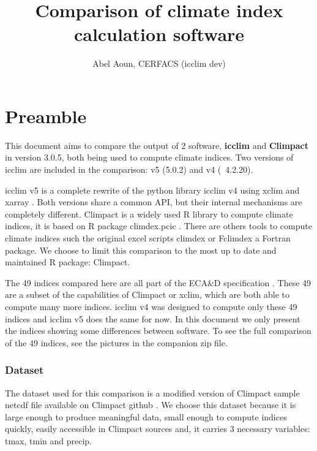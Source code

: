 \documentclass[a4paper,11pt]{article}
\title{Comparison of climate index calculation software}
\author{Abel Aoun, CERFACS (icclim dev)}
\begin{document}
\maketitle
\part*{Preamble}
    This document aims to compare the output of 2 software, \textbf{icclim} \cite{gh/icclim} and \textbf{Climpact} \cite{gh/Climpact} in version 3.0.5, both being used to compute climate indices.
    Two versions of icclim are included in the comparison: v5 (5.0.2) and v4 (~4.2.20).

    icclim v5 is a complete rewrite of the python library icclim v4 using xclim \cite{gh/xclim} and xarray \cite{gh/xarray}. Both versions share a common API, but their internal mechanisms are completely different.
    Climpact is a widely used R library to compute climate indices, it is based on R package climdex.pcic \cite{gh/climdex}.
    There are others tools to compute climate indices such the original excel scripts climdex \cite{doc/climdex} or Fclimdex \cite{gh/fclimdex} a Fortran package.
    We choose to limit this comparison to the most up to date and maintained R package: Climpact.

    The 49 indices compared here are all part of the ECA\&D specification \cite{doc/ecad_new}.
    These 49 are a subset of the capabilities of Climpact or xclim, which are both able to compute many more indices.
    icclim v4 was designed to compute only these 49 indices and icclim v5 does the same for now.
    In this document we only present the indices showing some differences between software.
    To see the full comparison of the 49 indices, see the pictures in the companion zip file.

    \section{Dataset}
        The dataset used for this comparison is a modified version of Climpact sample netcdf file available on Climpact github \cite{gh/Climpact}.
        We choose this dataset because it is large enough to produce meaningful data, small enough to compute indices quickly, 
        easily accessible in Climpact sources and, it carries 3 necessary variables: tmax, tmin and precip.
\end{document}
